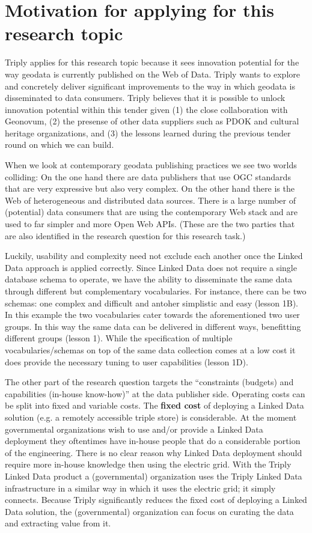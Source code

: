 \documentclass[a4paper]{scrartcl}
\begin{document}
\section{Motivation for applying for this research topic}

Triply applies for this research topic because it sees innovation
potential for the way geodata is currently published on the Web of
Data.  Triply wants to explore and concretely deliver significant
improvements to the way in which geodata is disseminated to data
consumers.  Triply believes that it is possible to unlock innovation
potential within this tender given (1) the close collaboration with
Geonovum, (2) the presense of other data suppliers such as PDOK and
cultural heritage organizations, and (3) the lessons learned during
the previous tender round on which we can build.

When we look at contemporary geodata publishing practices we see two
worlds colliding: On the one hand there are data publishers that use
OGC standards that are very expressive but also very complex.  On the
other hand there is the Web of heterogeneous and distributed data
sources.  There is a large number of (potential) data consumers that
are using the contemporary Web stack and are used to far simpler and
more Open Web APIs.  (These are the two parties that are also
identified in the research question for this research task.)

Luckily, usability and complexity need not exclude each another once
the Linked Data approach is applied correctly.  Since Linked Data does
not require a single database schema to operate, we have the ability
to disseminate the same data through different but complementary
vocabularies.  For instance, there can be two schemas: one complex and
difficult and antoher simplistic and easy (lesson 1B).  In this
example the two vocabularies cater towards the aforementioned two user
groups.  In this way the same data can be delivered in different ways,
benefitting different groups (lesson 1).  While the specification of
multiple vocabularies/schemas on top of the same data collection comes
at a low cost it does provide the necessary tuning to user
capabilities (lesson 1D).

The other part of the research question targets the ``constraints
(budgets) and capabilities (in-house know-how)'' at the data publisher
side.  Operating costs can be split into fixed and variable costs.
The \textbf{fixed cost} of deploying a Linked Data solution (e.g. a
remotely accessible triple store) is considerable.  At the moment
governmental organizations wish to use and/or provide a Linked Data
deployment they oftentimes have in-house people that do a considerable
portion of the engineering.  There is no clear reason why Linked Data
deployment should require more in-house knowledge then using the
electric grid.  With the Triply Linked Data product a (governmental)
organization uses the Triply Linked Data infrastructure in a similar
way in which it uses the electric grid; it simply connects.  Because
Triply significantly reduces the fixed cost of deploying a Linked Data
solution, the (governmental) organization can focus on curating the
data and extracting value from it.
\end{document}
